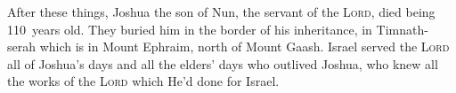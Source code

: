 \begin{inparaenum}
     After these things, Joshua the son of Nun, the servant of the \textsc{Lord}, died being 110~years old.%
     They buried him in the border of his inheritance,  in Timnath-serah which is in Mount Ephraim, north of Mount Gaash.%
     Israel served the \textsc{Lord} all of Joshua's days and all the elders' days who outlived Joshua, who knew all the works of the \textsc{Lord} which He'd done for Israel.%
\end{inparaenum}
